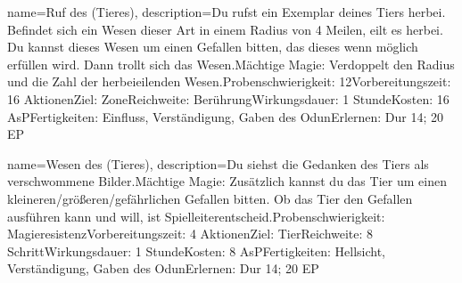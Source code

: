 {
    name={Ruf des (Tieres)},
    description={Du rufst ein Exemplar deines Tiers herbei. Befindet sich ein Wesen dieser Art in einem Radius von 4 Meilen, eilt es herbei. Du kannst dieses Wesen um einen Gefallen bitten, das dieses wenn möglich erfüllen wird. Dann trollt sich das Wesen.\newline Mächtige Magie: Verdoppelt den Radius und die Zahl der herbeieilenden Wesen.\newline Probenschwierigkeit: 12\newline Vorbereitungszeit: 16 Aktionen\newline Ziel: Zone\newline Reichweite: Berührung\newline Wirkungsdauer: 1 Stunde\newline Kosten: 16 AsP\newline Fertigkeiten: Einfluss, Verständigung, Gaben des Odun\newline Erlernen: Dur 14; 20 EP}
}


{
    name={Wesen des (Tieres)},
    description={Du siehst die Gedanken des Tiers als verschwommene Bilder.\newline Mächtige Magie: Zusätzlich kannst du das Tier um einen kleineren/größeren/gefährlichen Gefallen bitten. Ob das Tier den Gefallen ausführen kann und will, ist Spielleiterentscheid.\newline Probenschwierigkeit: Magieresistenz\newline Vorbereitungszeit: 4 Aktionen\newline Ziel: Tier\newline Reichweite: 8 Schritt\newline Wirkungsdauer: 1 Stunde\newline Kosten: 8 AsP\newline Fertigkeiten: Hellsicht, Verständigung, Gaben des Odun\newline Erlernen: Dur 14; 20 EP}
}


